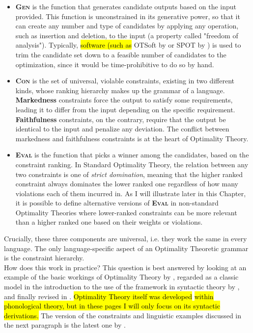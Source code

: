 \begin{itemize}
    \item \textsc{\textbf{Gen}} is the function that generates candidate outputs based on the input provided. This function is unconstrained in its generative power, so that it can create any number and type of candidates by applying any operation, such as insertion and deletion, to the input (a property called "freedom of analysis"). Typically, \hl{software (such as} OTSoft by \textcite{hayes2003otsoft} or SPOT by \textcite{bellik2019automated}) is used to trim the candidate set down to a feasible number of candidates to the optimization, since it would be time-prohibitive to do so by hand.
    \item \textsc{\textbf{Con}} is the set of universal, violable constraints, existing in two different kinds, whose ranking hierarchy makes up the grammar of a language. \textbf{Markedness} constraints force the output to satisfy some requirements, leading it to differ from the input depending on the specific requirement. \textbf{Faithfulness} constraints, on the contrary, require that the output be identical to the input and penalize any deviation. The conflict between markedness and faithfulness constraints is at the heart of Optimality Theory.
    \item \textsc{\textbf{Eval}} is the function that picks a winner among the candidates, based on the constraint ranking. In Standard Optimality Theory, the relation between any two constraints is one of \textit{strict domination}, meaning that the higher ranked constraint always dominates the lower ranked one regardless of how many violations each of them incurred in. As I will illustrate later in this Chapter, it is possible to define alternative versions of \textsc{\textbf{Eval}} in non-standard Optimality Theories where lower-ranked constraints can be more relevant than a higher ranked one based on their weights or violations.
\end{itemize}
Crucially, these three components are universal, i.e. they work the same in every language. The only language-specific aspect of an Optimality Theoretic grammar is the constraint hierarchy.\\
How does this work in practice? This question is best answered by looking at an example of the basic workings of Optimality Theory by \textcite{grimshaw1998optimal}, regarded as a classic model in the introduction to the use of the framework in syntactic theory by \textcite{legendre2001introduction}, and finally revised in \textcite{legendre2019otsyntax}. \hl{Optimality Theory itself was developed} \parencite{princesmolensky1993optimality} \hl{within phonological theory, but in these pages I will only focus on its syntactic derivations.} The version of the constraints and linguistic examples discussed in the next paragraph is the latest one by \textcite{legendre2019otsyntax}. 

